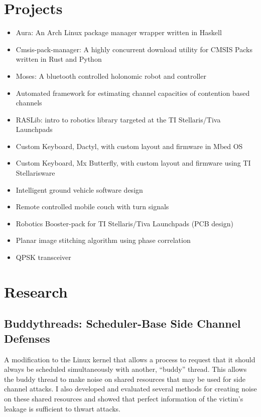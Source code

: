 \documentclass[letterpaper,12pt]{resume}
\begin{document}
\section{Projects}
\begin{itemize} 
  \item
    Aura: An Arch Linux package manager wrapper written in Haskell
  \item 
    Cmsis-pack-manager: A highly concurrent download utility for CMSIS Packs written in Rust and Python
  \item
    Moses: A bluetooth controlled holonomic robot and controller
  \item
    Automated framework for estimating channel capacities of contention based channels
  \item
    RASLib: intro to robotics library targeted at the TI Stellaris/Tiva Launchpads
  \item
    Custom Keyboard, Dactyl, with custom layout and firmware in Mbed OS
  \item
    Custom Keyboard, Mx Butterfly, with custom layout and firmware using TI Stellarisware
  \item
    Intelligent ground vehicle software design
  \item
    Remote controlled mobile couch with turn signals
  \item
    Robotics Booster-pack for TI Stellaris/Tiva Launchpads (PCB design)
  \item
    Planar image stitching algorithm using phase correlation
  \item
    QPSK transceiver
\end{itemize}

\section{Research}
\subsection{Buddythreads: Scheduler-Base Side Channel Defenses}
A modification to the Linux kernel that allows a process to request that it
should always be scheduled simultaneously with another, ``buddy'' thread.
This allows the buddy thread to make noise on shared resources that may be used
for side channel attacks.
I also developed and evaluated several methods for creating noise on these
shared resources and showed that perfect information of the victim's leakage is
sufficient to thwart attacks.
\end{document}
